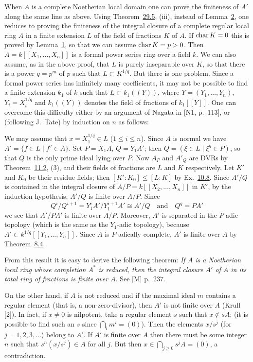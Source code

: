 When $A$ is a complete Noetherian local domain one can prove the finiteness of
$A'$ along the same line as above. Using Theorem~\hyperref[thm:29.5]{29.5}, (iii), instead of
Lemma~\hyperref[lem:33.2]{2}, one reduces to proving the finiteness of the integral closure of a
complete regular local ring $A$ in a finite extension $L$ of the field of fractions
$K$ of $A$. If $\operatorname{char} K = 0$ this is proved by Lemma~\hyperref[lem:33.1]{1}, so that we can assume
$\operatorname{char} K = p > 0$. Then $A = k[[X_1, \ldots, X_n]]$ is a formal power series ring over a
field $k$. We can also assume, as in the above proof, that $L$ is purely
inseparable over $K$, so that there is a power $q = p^m$ of $p$ such that
$L \subset K^{1/q}$. But there is one problem. Since a formal power series has
infinitely many coefficients, it may not be possible to find a finite extension
$k_1$ of $k$ such that $L \subset k_1((Y))$, where $Y = (Y_1, \ldots, Y_n)$,
$Y_i = X_i^{1/q}$ and $k_1((Y))$ denotes the field of fractions of $k_1[[Y]]$. One can
overcome this difficulty either by an argument of Nagata in [N1, p.~113], or
(following J.~Tate) by induction on $n$ as follows:

We may assume that $x = X_1^{1/q} \in L$ ($1 \le i \le n$). Since $A$ is normal we have
$A' = \{f \in L \mid f^q \in A\}$. Set $P = X_1A$, $Q = Y_1A'$; then
$Q = (\xi \in L \mid \xi^q \in P)$, so that $Q$ is the only prime ideal lying over $P$. Now
$A_P$ and $A'_Q$ are DVRs by Theorem~\hyperref[thm:11.2]{11.2}, (3), and their fields of fractions
are $L$ and $K$ respectively. Let $K'$ and $K_0$ be their residue fields; then
$[K' : K_0] \le [L : K]$ by Ex.~\hyperref[ex:10.8-ex]{10.8}. Since $A'/Q$ is contained in the integral
closure of $A/P = k[[X_2, \ldots, X_n]]$ in $K'$, by the induction hypothesis, $A'/Q$ is
finite over $A/P$. Since
\[
  Q^i/Q^{i+1} = Y_1^iA'/Y_1^{i+1}A' \cong A'/Q \quad \text{and} \quad Q^q = PA'
\]
we see that $A'/PA'$ is finite over $A/P$. Moreover, $A'$ is separated in the $P$-adic
topology (which is the same as the $Y_1$-adic topology), because
$A' \subset k^{1/q}[[Y_1, \ldots, Y_n]]$. Since $A$ is $P$-adically complete, $A'$ is finite over
$A$ by Theorem~\hyperref[thm:8.4]{8.4}.

From this result it is easy to derive the following theorem: \emph{If $A$ is a Noetherian
local ring whose completion $A^*$ is reduced, then the integral closure $A'$ of $A$ in its
total ring of fractions is finite over $A$}. See [M] p.~237.

On the other hand, if $A$ is not reduced and if the maximal ideal $m$ contains a
regular element (that is, a non-zero-divisor), then $A'$ is not finite over $A$
(Krull [2]). In fact, if $x \ne 0$ is nilpotent, take a regular element $s$ such that
$x \notin sA$; (it is possible to find such an $s$ since $\bigcap_i m^i = (0)$). Then the
elements $x/s^j$ (for $j = 1, 2, 3, \ldots$) belong to $A'$. If $A'$ is finite over $A$ then
there must be some integer $n$ such that $s^n(x/s^j) \in A$ for all $j$. But then
$x \in \bigcap_{j \ge 0}s^jA = (0)$, a contradiction.


